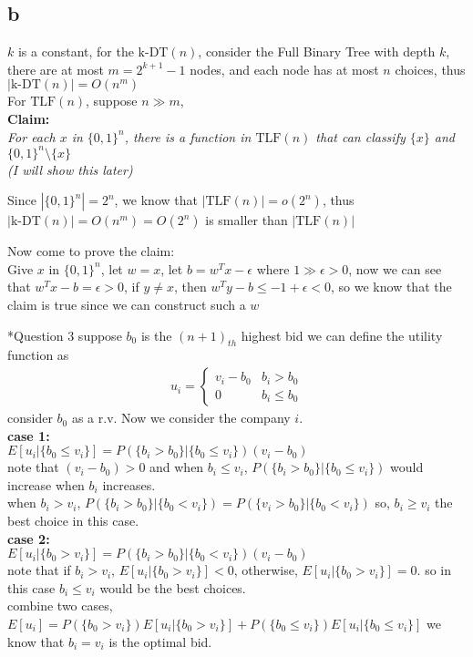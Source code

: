 \documentclass[12pt]{amsart}
\makeatletter
\renewcommand{\section}{\@startsection{section}{1}{0mm}
{-\baselineskip}{0.5\baselineskip}{\bf\leftline}}
\makeatother
\begin{document}
\subsection*{b}
$k$ is a constant, for the $\mbox{k-DT}(n)$,  consider the Full Binary Tree with depth $k$, there are at most $m=2^{k+1}-1$ nodes, and each node has at most $n$ choices, thus
$|\mbox{k-DT}(n)|=O(n^m)$\\
For $\mbox{TLF}(n)$, suppose $n \gg m$, \\
\textbf{Claim:}\\
\textit{For each $x$ in $\{0,1\}^n$, there is a function in $\mbox{TLF}(n)$ that can classify $\{x\}$ and $\{0,1\}^n\setminus\{x\}$\\
(I will show this later)\\}
 
Since $|\{0,1\}^n|=2^n$, we know that $|\mbox{TLF}(n)|=o(2^n)$, thus $|\mbox{k-DT}(n)|=O(n^m)=O(2^n)$ is smaller than $|\mbox{TLF}(n)|$

Now come to prove the claim:\\
Give $x$ in $\{0,1\}^n$, let $w=x$, let $b = w^Tx-\epsilon$ where $1 \gg \epsilon > 0$, now we can see that $w^Tx-b = \epsilon > 0$, if $y\neq x$, then $w^Ty-b \leq -1+\epsilon < 0$, so we know that the claim is true since we can construct such a $w$

\section*{Question 3}
suppose $b_0$ is the $(n+1)_{th}$ highest bid
we can define the utility function as
\begin{eqnarray}
  \label{eq:1}
  u_i=
  \begin{cases}
    v_i-b_0     & b_i > b_0\\
    0          & b_i \leq b_0
  \end{cases}
\end{eqnarray}
consider $b_0$ as a r.v.
Now we consider the company $i$.\\
\textbf{case 1:}\\
$E[u_i|\{b_0 \leq v_i\}] = P(\{b_i>b_0\}|\{b_0 \leq v_i\})(v_i-b_0)$\\
note that $(v_i-b_0)>0$ and when $b_i \leq v_i$, $P(\{b_i>b_0\}|\{b_0 \leq v_i\})$ 
would increase when $b_i$ increases.\\
when $b_i > v_i$, $P(\{b_i>b_0\}|\{b_0 < v_i\}) = P(\{v_i>b_0\}|\{b_0 < v_i\})$
so, $b_i\geq v_i$ the best choice in this case.\\
\textbf{case 2:}\\
$E[u_i|\{b_0 > v_i\}] = P(\{b_i>b_0\}|\{b_0 < v_i\})(v_i-b_0)$\\
note that if $b_i>v_i$, $E[u_i|\{b_0 > v_i\}] < 0 $, otherwise,
$E[u_i|\{b_0 > v_i\}] = 0$. so in this case $b_i\leq v_i$ would be the best choices.\\
combine two cases, $E[u_i]=P(\{b_0 > v_i\})E[u_i|\{b_0 > v_i\}]+P(\{b_0 \leq v_i\})E[u_i|\{b_0 \leq v_i\}]$ we know that $b_i=v_i$ is the optimal bid.  
\end{document}
